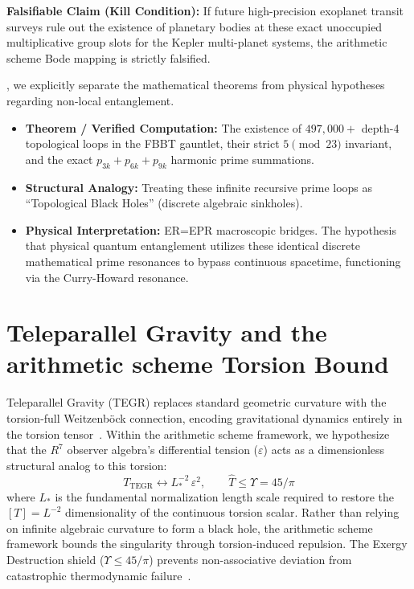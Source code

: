 \textbf{Falsifiable Claim (Kill Condition):} If future high-precision exoplanet transit surveys rule out the existence of planetary bodies at these exact unoccupied multiplicative group slots for the Kepler multi-planet systems, the arithmetic scheme Bode mapping is strictly falsified.

, we explicitly separate the mathematical theorems from physical hypotheses regarding non-local entanglement.
\begin{itemize}[noitemsep]
    \item \textbf{Theorem / Verified Computation:} The existence of $497,000+$ depth-4 topological loops in the FBBT gauntlet, their strict $5 \pmod{23}$ invariant, and the exact $p_{3k} + p_{6k} + p_{9k}$ harmonic prime summations.
    \item \textbf{Structural Analogy:} Treating these infinite recursive prime loops as ``Topological Black Holes'' (discrete algebraic sinkholes).
    \item \textbf{Physical Interpretation:} ER=EPR macroscopic bridges. The hypothesis that physical quantum entanglement utilizes these identical discrete mathematical prime resonances to bypass continuous spacetime, functioning via the Curry-Howard resonance.
\end{itemize}

\section{Teleparallel Gravity and the arithmetic scheme Torsion Bound}

Teleparallel Gravity (TEGR) replaces standard geometric curvature with the torsion-full Weitzenb\"{o}ck connection, encoding gravitational dynamics entirely in the torsion tensor~\cite{maluf2013, bahamonde2023}. Within the arithmetic scheme framework, we hypothesize that the $R^7$ observer algebra's differential tension ($\varepsilon$) acts as a dimensionless structural analog to this torsion:
\begin{equation}
    T_{\text{TEGR}} \longleftrightarrow L_*^{-2} \, \varepsilon^2, \qquad \widehat{T} \leq \Upsilon = 45/\pi
\end{equation}
where $L_*$ is the fundamental normalization length scale required to restore the $[T] = L^{-2}$ dimensionality of the continuous torsion scalar.
Rather than relying on infinite algebraic curvature to form a black hole, the arithmetic scheme framework bounds the singularity through torsion-induced repulsion. The Exergy Destruction shield ($\Upsilon \leq 45/\pi$) prevents non-associative deviation from catastrophic thermodynamic failure~\cite{layden2025}.


